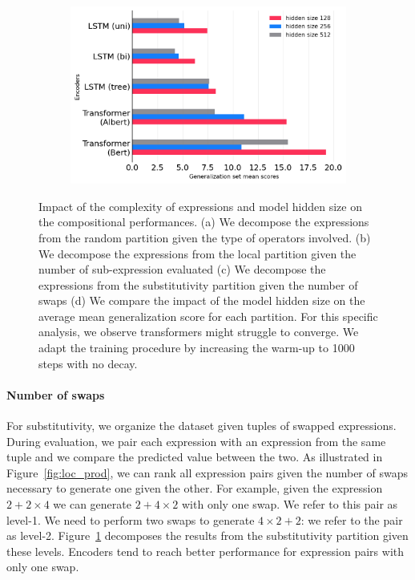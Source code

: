 \begin{figure}[htb!]
\begin{subfigure}[b]{7.52cm}
        \caption{}
        \label{subfig:substitutivity-study}
    \end{subfigure}
    \hfill
    \begin{subfigure}[b]{7.52cm}
        \centering 
        \includegraphics[width=\textwidth]{images/hidden-size-study_v2.png}
        \caption{}
        \label{subfig:hidden-size}
    \end{subfigure}
    \caption{Impact of the complexity of expressions and model hidden size on the compositional performances. (a) We decompose the expressions from the random partition given the type of operators involved. (b) We decompose the expressions from the local partition given the number of sub-expression evaluated (c) We decompose the expressions from the substitutivity partition given the number of swaps (d) We compare the impact of the model hidden size on the average mean generalization score for each partition. For this specific analysis, we observe transformers might struggle to converge. We adapt the training procedure by increasing the warm-up to 1000 steps with no decay.}
\end{figure}

\paragraph{Number of swaps} For substitutivity, we organize the dataset given tuples of swapped expressions. During evaluation, we pair each expression with an expression from the same tuple and we compare the predicted value between the two. As illustrated in Figure~\ref{fig:loc_prod}, we can rank all expression pairs given the number of swaps necessary to generate one given the other. For example, given the expression $2 + 2 \times 4$ we can generate $2 + 4 \times 2$ with only one swap. We refer to this pair as level-1. We need to perform two swaps to generate $4 \times 2 + 2$: we refer to the pair as level-2. Figure~\ref{subfig:substitutivity-study} decomposes the results from the substitutivity partition given these levels. Encoders tend to reach better performance for expression pairs with only one swap. 

